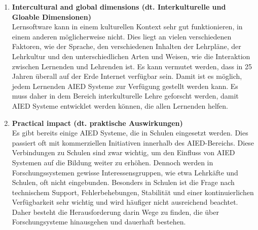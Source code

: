 \begin{enumerate}
    \item \textbf{Intercultural and global dimensions (dt. Interkulturelle und Gloable Dimensionen)} \\
          Lernsoftware kann in einem kulturellen Kontext sehr gut funktionieren, in einem anderen möglicherweise nicht. Dies liegt an vielen verschiedenen Faktoren, wie der Sprache, den verschiedenen Inhalten der Lehrpläne, der Lehrkultur und den unterschiedlichen Arten und Weisen, wie die Interaktion zwischen Lernenden und Lehrenden ist. Es kann vermutet werden, dass in 25 Jahren überall auf der Erde Internet verfügbar sein. Damit ist es möglich, jedem Lernenden AIED Systeme zur Verfügung gestellt werden kann. Es muss daher in dem Bereich interkulturelle Lehre geforscht werden, damit AIED Systeme entwicklet werden können, die allen Lernenden helfen. \cite[S. 9f]{Pinkwart.2016}

    \item \textbf{Practical impact (dt. praktische Auswirkungen)} \\
          Es gibt bereits einige AIED Systeme, die in Schulen eingesetzt werden. Dies passiert oft mit kommerziellen Initiativen innerhalb des AIED-Bereichs.
          Diese Verbindungen zu Schulen sind zwar wichtig, um den Einfluss von AIED Systemen auf die Bildung weiter zu erhöhen. Dennoch werden in Forschungssystemen gewisse Interessensgruppen, wie etwa Lehrkäfte und Schulen, oft nicht eingebunden.
          Besonders in Schulen ist die Frage nach technischem Support, Fehlerbehebungen, Stabilität und einer kontinuierlichen Verfügbarkeit sehr wichtig und wird häufiger nicht ausreichend beachtet.
          Daher besteht die Herausforderung darin Wege zu finden, die über Forschungsysteme hinausgehen und dauerhaft bestehen. \cite[S. 10]{Pinkwart.2016}


\end{enumerate}

